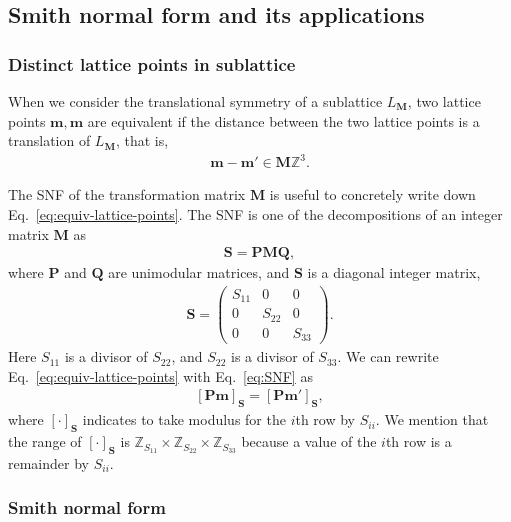 \subsection{Smith normal form and its applications}

\subsubsection{Distinct lattice points in sublattice}

When we consider the translational symmetry of a sublattice $L_{\bm{M}}$, two lattice points $\bm{m}, \bm{m}$ are equivalent if the distance between the two lattice points is a translation of $L_{\bm{M}}$, that is,
\begin{align}
  \label{eq:equiv-lattice-points}
  \bm{m} - \bm{m}' \in \bm{M}\mathbb{Z}^{3}.
\end{align}

The SNF of the transformation matrix $\mathbf{M}$ is useful to concretely write down Eq.~\eqref{eq:equiv-lattice-points}.
The SNF is one of the decompositions of an integer matrix $\mathbf{M}$ as
\begin{align}
  \label{eq:SNF}
  \bm{S} = \bm{PMQ},
\end{align}
where $\bm{P}$ and $\bm{Q}$ are unimodular matrices, and $\mathbf{S}$ is a diagonal integer matrix,
\begin{align}
  \bm{S} =
      \begin{pmatrix}
          S_{11} & 0 & 0 \\
          0 & S_{22} & 0 \\
          0 & 0 & S_{33}
      \end{pmatrix}.
\end{align}
Here $S_{11}$ is a divisor of $S_{22}$, and $S_{22}$ is a divisor of $S_{33}$.
We can rewrite Eq.~\eqref{eq:equiv-lattice-points} with Eq.~\eqref{eq:SNF} as
\begin{align}
  \label{eq:equiv-represents}
  [\bm{Pm}]_{\bm{S}} = [\bm{Pm}']_{\bm{S}},
\end{align}
where $[\cdot]_{\bm{S}}$ indicates to take modulus for the $i$th row by $S_{ii}$.
We mention that the range of $[\cdot]_{\mathbf{S}}$ is $\mathbb{Z}_{S_{11}} \times \mathbb{Z}_{S_{22}} \times \mathbb{Z}_{S_{33}}$ because a value of the $i$th row is a remainder by $S_{ii}$.

\subsubsection{Smith normal form}

